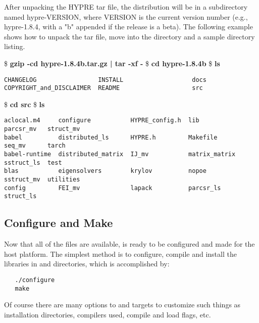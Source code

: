 After unpacking the HYPRE tar file, the distribution will be in a 
subdirectory named hypre-VERSION, where VERSION is the current version number
(e.g., hypre-1.8.4, with a "b" appended if the release is a beta).
The following example shows how to unpack the tar file, move into the \hypre{}
directory and a sample directory listing.
\begin{ttfamily}
\begin{mdseries}
\linebreak
\$ \textbf{gzip -cd hypre-1.8.4b.tar.gz | tar -xf -}\linebreak
\$ \textbf{cd hypre-1.8.4b}\linebreak
\$ \textbf{ls}\linebreak
\begin{verbatim}
CHANGELOG                 INSTALL                   docs
COPYRIGHT_and_DISCLAIMER  README                    src
\end{verbatim}
\$ \textbf{cd src}\linebreak
\$ \textbf{ls}\linebreak
\begin{verbatim}
aclocal.m4     configure           HYPRE_config.h  lib            parcsr_mv   struct_mv
babel          distributed_ls      HYPRE.h         Makefile       seq_mv      tarch
babel-runtime  distributed_matrix  IJ_mv           matrix_matrix  sstruct_ls  test
blas           eigensolvers        krylov          nopoe          sstruct_mv  utilities
config         FEI_mv              lapack          parcsr_ls      struct_ls
\end{verbatim}
\end{mdseries}
\end{ttfamily}


\subsection{Configure and Make}
\label{sec-Configure}

Now that all of the files are available, \hypre{} is ready to be configured and 
made for the host platform.  The simplest method is to configure, compile and
install the libraries in  and  directories, which is
accomplished by:
\begin{verbatim}
   ./configure
   make
\end{verbatim}

Of course there are many options to  and  targets to 
customize such things as installation directories, compilers used, compile and
load flags, etc.  

